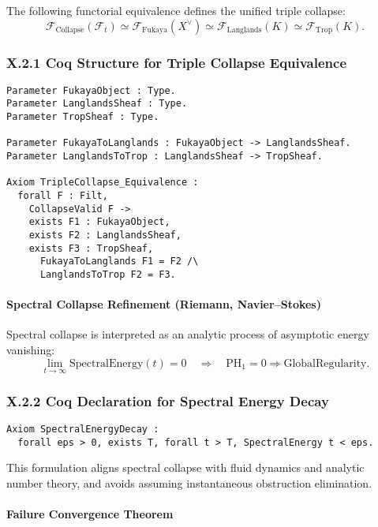 \documentclass[11pt]{article}
\begin{document}
The following functorial equivalence defines the unified triple collapse:
\[
\mathcal{F}_{\mathrm{Collapse}}(\mathcal{F}_t) \simeq
\mathcal{F}_{\mathrm{Fukaya}}(X^\vee) \simeq
\mathcal{F}_{\mathrm{Langlands}}(K) \simeq
\mathcal{F}_{\mathrm{Trop}}(K).
\]

\subsubsection*{X.2.1 Coq Structure for Triple Collapse Equivalence}

\begin{lstlisting}[language=Coq]
Parameter FukayaObject : Type.
Parameter LanglandsSheaf : Type.
Parameter TropSheaf : Type.

Parameter FukayaToLanglands : FukayaObject -> LanglandsSheaf.
Parameter LanglandsToTrop : LanglandsSheaf -> TropSheaf.

Axiom TripleCollapse_Equivalence :
  forall F : Filt,
    CollapseValid F ->
    exists F1 : FukayaObject,
    exists F2 : LanglandsSheaf,
    exists F3 : TropSheaf,
      FukayaToLanglands F1 = F2 /\
      LanglandsToTrop F2 = F3.
\end{lstlisting}

\paragraph{Spectral Collapse Refinement (Riemann, Navier–Stokes)}

Spectral collapse is interpreted as an analytic process of asymptotic energy vanishing:
\[
\lim_{t \to \infty} \mathrm{SpectralEnergy}(t) = 0 \quad \Rightarrow \quad \mathrm{PH}_1 = 0 \Rightarrow \mathrm{GlobalRegularity}.
\]

\subsubsection*{X.2.2 Coq Declaration for Spectral Energy Decay}

\begin{lstlisting}[language=Coq]
Axiom SpectralEnergyDecay :
  forall eps > 0, exists T, forall t > T, SpectralEnergy t < eps.
\end{lstlisting}

This formulation aligns spectral collapse with fluid dynamics and analytic number theory, and avoids assuming instantaneous obstruction elimination.

\paragraph{Failure Convergence Theorem}
\end{document}
